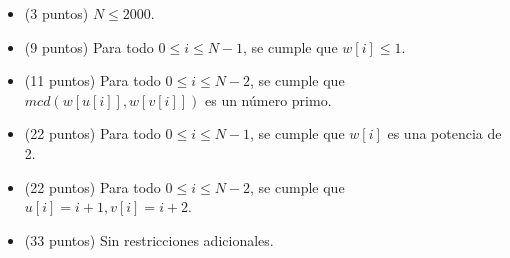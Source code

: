 \documentclass[12pt]{scrartcl}
\begin{document}


    \begin{itemize}
        \item (3 puntos) $N \le 2000$.
        \item (9 puntos) Para todo $0 \le i \le N - 1$, se cumple que $w[i] \le 1$.
        \item (11 puntos) Para todo $0 \le i \le N - 2$, se cumple que $mcd(w[u[i]], w[v[i]])$ es un número primo.
        \item (22 puntos) Para todo $0 \le i \le N - 1$, se cumple que $w[i]$ es una potencia de 2.
        \item (22 puntos) Para todo $0 \le i \le N - 2$, se cumple que $u[i] = i + 1, v[i] = i + 2$.
        \item (33 puntos) Sin restricciones adicionales.
    \end{itemize}
\end{document}
